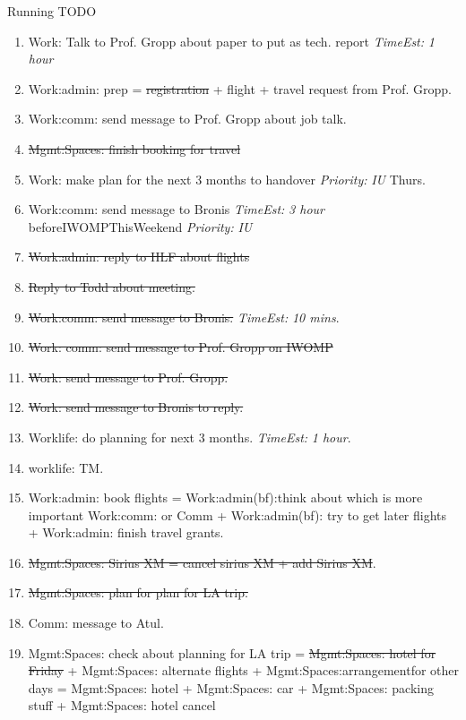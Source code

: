 \documentclass[serif, mathserif, final]{beamer}
\newcommand{\doneTaskNoItem}[1]{\sout{#1}}
\newcommand{\doneTask}[1]{\tiny \item \tiny \sout{#1}}
\newcommand{\te}[1]{\textit{TimeEst:} \textit{#1}}
\newcommand{\priority}[1]{\textit{Priority:} \textit{#1}}
\newcommand{\dl}[1]{#1}
\begin{document}
\begin{frame}{}
\begin{columns}
\begin{column}{0.50\linewidth}
\begin{block}{Running TODO}
\begin{enumerate}
    \item \small Work: Talk to Prof. Gropp about paper to put as
      tech. report \te{1 hour} 

    \item \small Work:admin: prep = \doneTaskNoItem{registration} +
      flight + travel request from Prof. Gropp.  
    \item \small Work:comm: send message to Prof. Gropp about job
      talk. \doneTask{Mgmt:Spaces: finish booking for travel} 
    \item \small Work: make plan for the next 3 months to handover
      \priority{IU} \dl{Thurs}. 

    \item \small Work:comm: send message to Bronis \te{3 hour}
      \dl{beforeIWOMPThisWeekend} \priority{IU}

    
        \doneTask{ Work:admin: reply to HLF about flights} 
        \doneTask{Reply to Todd about meeting. }   
        \doneTask{Work:comm: send message to Bronis.}  \te{10 mins}. 
        
        \doneTask{ Work: comm: send message to Prof. Gropp on IWOMP}         
        \doneTask{Work: send message to Prof. Gropp.} 
        \doneTask{ Work: send message to Bronis to reply.}
        
      \item \small Worklife: do planning for next 3 months. \te{1 hour}. 
      \item \small worklife: TM. 
      \item \small Work:admin: book flights = Work:admin(bf):think
        about which is more important Work:comm: or Comm  +
        Work:admin(bf): try to get later flights + Work:admin: finish
        travel grants. 
        \doneTask{Mgmt:Spaces: Sirius XM  = cancel sirius
          XM + add Sirius XM}. 
        

        \doneTask{Mgmt:Spaces: plan for plan for LA trip.} 
      \item \small Comm: message to Atul. 

      \item \small Mgmt:Spaces: check about planning for LA trip = 
        \doneTaskNoItem{Mgmt:Spaces: hotel for Friday} +
        Mgmt:Spaces: alternate flights + Mgmt:Spaces:arrangementfor
        other days = Mgmt:Spaces: hotel + Mgmt:Spaces: car 
        + Mgmt:Spaces: packing stuff + Mgmt:Spaces: hotel cancel 
        

\end{enumerate}
\end{block}
\end{column}
\end{columns}
\end{frame}
\end{document}
